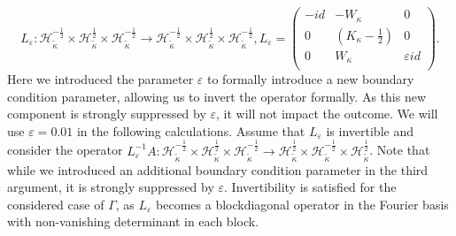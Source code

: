 \documentclass[12pt,journal,compsoc, onecolumn]{IEEEtran}
\begin{document}
\begin{equation} 
\label{eq:L_operator}
L_\varepsilon: \mathcal{H}_{\tilde \kappa}^{-\frac{1}{2}} \times \mathcal{H}_{\tilde \kappa}^{\frac{1}{2}} \times \mathcal{H}_{\tilde \kappa}^{-\frac{1}{2}} \rightarrow \mathcal{H}_{\tilde \kappa}^{-\frac{1}{2}} \times \mathcal{H}_{\tilde \kappa}^{\frac{1}{2}} \times \mathcal{H}_{\tilde \kappa}^{-\frac{1}{2}}, 
L_\varepsilon = 
        \begin{pmatrix}
            -id & -W_{\kappa} &  0\\
            0 & (K_{\kappa} - \frac{1}{2}) & 0 \\
            0 & W_{\kappa} & \varepsilon id \\
        \end{pmatrix}.
\end{equation}
Here we introduced the parameter $\varepsilon$ to formally introduce a new boundary condition parameter, allowing us to invert the operator formally. As this new component is strongly suppressed by $\varepsilon$, it will not impact the outcome. We will use $\varepsilon = 0.01$ in the following calculations. 
Assume that $L_\varepsilon$ is invertible and consider the operator $L_\varepsilon^{-1}A:  \mathcal{H}_{\tilde \kappa}^{-\frac{1}{2}} \times \mathcal{H}_{\tilde \kappa}^{\frac{1}{2}} \times \mathcal{H}_{\tilde \kappa}^{-\frac{1}{2}} \rightarrow  \mathcal{H}_{\tilde \kappa}^{\frac{1}{2}} \times \mathcal{H}_{\tilde \kappa}^{-\frac{1}{2}} \times \mathcal{H}_{\tilde \kappa}^{\frac{1}{2}}$. Note that while we introduced an additional boundary condition parameter in the third argument, it is strongly suppressed by $\varepsilon$. Invertibility is satisfied for the considered case of $\Gamma$, as $L_\varepsilon$ becomes a blockdiagonal operator in the Fourier basis with non-vanishing determinant in each block. 
\end{document}
